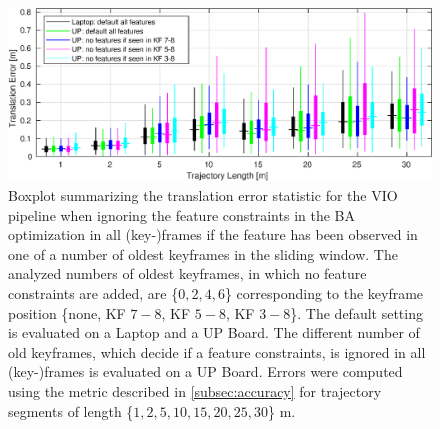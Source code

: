 \begin{minipage}[b]{1\linewidth}
\begin{figure}[H]
\centering
\includegraphics[width=1\textwidth]{images/acc_continue}
\caption{Boxplot summarizing the translation error statistic for the \ac{VIO}
pipeline when ignoring the feature constraints in the \ac{BA} optimization in 
all (key-)frames if the feature has been observed in one of a number of oldest 
keyframes in the sliding window. The analyzed numbers of oldest keyframes, in 
which no feature constraints are added, are \{$0, 2, 4, 6$\} corresponding to 
the keyframe position \{none, KF $7\!-\!8$, KF $5\!-\!8$, KF $3\!-\!8$\}. The 
default setting is evaluated on a Laptop and a UP Board. The different number 
of old keyframes, which decide if a feature constraints, is ignored in all 
(key-)frames is evaluated on a UP Board. Errors were computed using the metric 
described in \autoref{subsec:accuracy} for trajectory segments of length 
\{$1, 2, 5, 10, 15, 20, 25, 30$\} m.}
\label{fig:acc_continue}
\end{figure}
\end{minipage}

